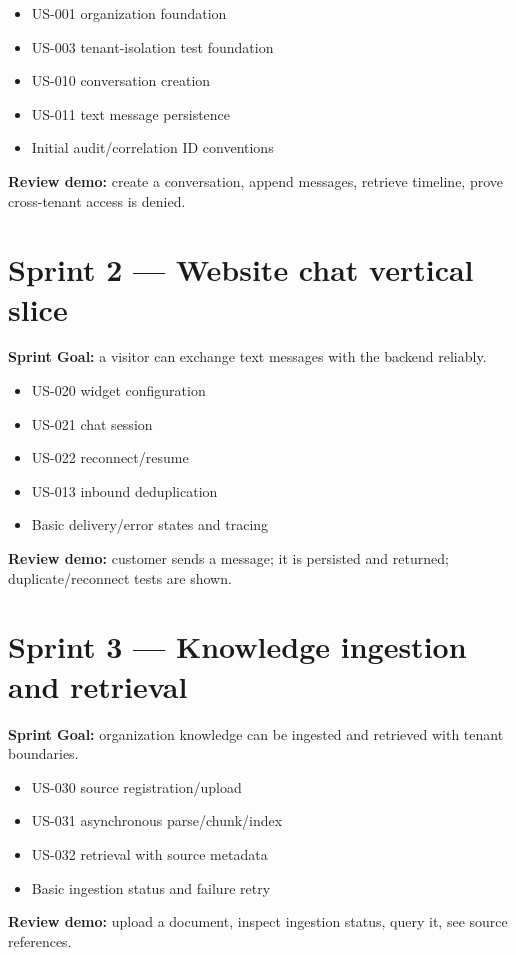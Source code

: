 \begin{itemize}
\item US-001 organization foundation
\item US-003 tenant-isolation test foundation
\item US-010 conversation creation
\item US-011 text message persistence
\item Initial audit/correlation ID conventions
\end{itemize}
\textbf{Review demo:} create a conversation, append messages, retrieve timeline, prove cross-tenant access is denied.



\section{Sprint 2 --- Website chat vertical slice}

\textbf{Sprint Goal:} a visitor can exchange text messages with the backend reliably.

\begin{itemize}
\item US-020 widget configuration
\item US-021 chat session
\item US-022 reconnect/resume
\item US-013 inbound deduplication
\item Basic delivery/error states and tracing
\end{itemize}
\textbf{Review demo:} customer sends a message; it is persisted and returned; duplicate/reconnect tests are shown.



\section{Sprint 3 --- Knowledge ingestion and retrieval}

\textbf{Sprint Goal:} organization knowledge can be ingested and retrieved with tenant boundaries.

\begin{itemize}
\item US-030 source registration/upload
\item US-031 asynchronous parse/chunk/index
\item US-032 retrieval with source metadata
\item Basic ingestion status and failure retry
\end{itemize}
\textbf{Review demo:} upload a document, inspect ingestion status, query it, see source references.

